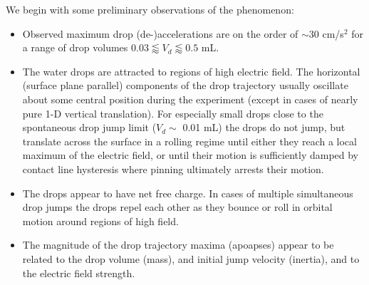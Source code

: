 \documentclass[12pt,a4paper,oneside]{book}
\begin{document}
We begin with some preliminary observations of the phenomenon:
\begin{itemize}
\item Observed maximum drop (de-)accelerations are on the order of $\sim$30 cm/s$^2$ for a range of drop volumes $0.03 \lessapprox V_d \lessapprox 0.5$ mL.
\item The water drops are attracted to regions of high electric field. The horizontal (surface plane parallel) components of the drop trajectory usually oscillate about some central position during the experiment (except in cases of nearly pure 1-D vertical translation). For especially small drops close to the spontaneous drop jump limit ($V_d \sim$ 0.01 mL) the drops do not jump, but translate across the surface in a rolling regime until either they reach a local maximum of the electric field, or until their motion is sufficiently damped by contact line hysteresis where pinning ultimately arrests their motion.
\item The drops appear to have net free charge. In cases of multiple simultaneous drop jumps the drops repel each other as they bounce or roll in orbital motion around regions of high field.
\item The magnitude of the drop trajectory maxima (apoapses) appear to be related to the drop volume (mass), and initial jump velocity (inertia), and to the electric field strength.
\end{itemize}
\end{document}
